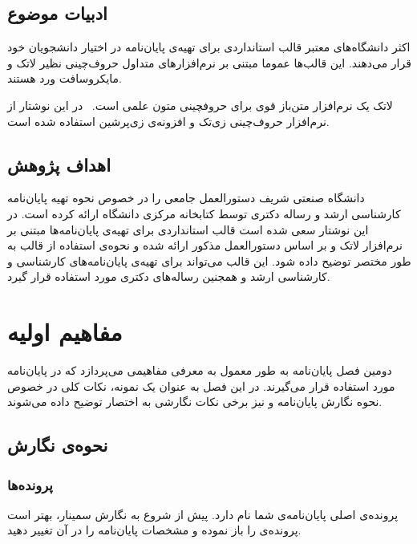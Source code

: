 \subsection{ادبیات موضوع}

اکثر دانشگاه‌های معتبر قالب استانداردی برای تهیه‌ی پایان‌نامه در اختیار دانشجویان خود قرار می‌دهند.
این قالب‌ها عموما مبتنی بر نرم‌افزارهای متداول حروف‌چینی نظیر لاتک و مایکروسافت ورد هستند.

لاتک یک نرم‌افزار متن‌باز قوی برای حروفچینی متون علمی است.~
در این نوشتار از نرم‌افزار حروف‌چینی زی‌تک
و افزونه‌ی زی‌پرشین
استفاده شده است.


\subsection{اهداف پژوهش}

دانشگاه صنعتی شریف دستورالعمل جامعی را در خصوص
نحوه تهیه پایان‌نامه کارشناسی ارشد و رساله دکتری توسط کتابخانه مرکزی دانشگاه ارائه کرده است.
در این نوشتار سعی شده است قالب استانداردی برای تهیه‌ی پایان‌نامه‌ها مبتنی بر نرم‌افزار لاتک و
بر اساس دستورالعمل مذکور ارائه شده و
نحوه‌ی استفاده از قالب به طور مختصر توضیح داده شود.
این قالب  می‌تواند برای تهیه‌ی پایان‌نامه‌های کارشناسی و کارشناسی ارشد
و همجنین رساله‌ها‌ی دکتری مورد استفاده قرار گیرد.


\section{مفاهیم اولیه}


دومین فصل پایان‌نامه به طور معمول به معرفی مفاهیمی می‌پردازد که در پایان‌نامه مورد استفاده قرار می‌گیرند.
در این فصل به عنوان یک نمونه، نکات کلی در خصوص نحوه نگارش پایان‌نامه و
نیز برخی نکات نگارشی به اختصار توضیح داده می‌شوند.

\subsection{نحوه‌ی نگارش}

\subsubsection{پرونده‌ها}

پرونده‌ی اصلی پایان‌نامه‌ی شما   نام دارد.
پیش از شروع به نگارش سمینار، بهتر است پرونده‌ی  را باز نموده و مشخصات پایان‌نامه را در آن تغییر دهید.


